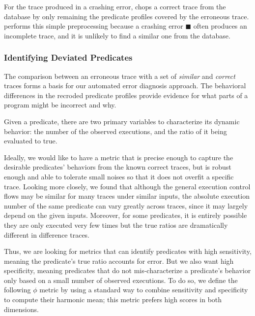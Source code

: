 For the trace produced in a crashing error, \ourtool 
chops a correct trace from the database by only remaining the predicate
profiles covered by the erroneous trace. \ourtool performs
this simple preprocessing because a crashing error $\blacksquare$
often produces an incomplete trace, and it is unlikely
to find a similar one from the database.


\subsubsection{Identifying Deviated Predicates}
\label{sec:deviation}


The comparison between an erroneous trace with a set
of \textit{similar} and \textit{correct} traces forms a basis for our
automated error diagnosis approach. 
The behavioral differences in the recroded predicate profiles provide evidence for what parts of a program might be
incorrect and why. %

Given a predicate, there are two primary variables to
characterize its dynamic behavior: the number of the
observed executions, and the ratio of it being evaluated to true.


Ideally, we would like to have a metric that
is precise enough to capture the desirable predicates' behaviors
from the known correct traces, but is robust enough and
able to tolerate small noises so that it does
not overfit a specific trace.
Looking more closely, we found that although
the general execution control flows may be similar for many 
traces under similar inputs, the absolute execution number of the same predicate
can vary greatly across traces, since it may
largely depend on the given inputs. Moreover, for
some predicates, it is entirely possible they are
only executed very few times but the true ratios
are dramatically different in difference traces.




Thus, we are looking for metrics that can identify
predicates with high sensitivity, meaning the predicate's true
ratio accounts for error. But we also want
high specificity, meaning predicates that do not mis-characterize
a predicate's behavior only based on a small number of
observed executions. To do so, we define the following
$\phi$ metric by using a standard way to
combine sensitivity and specificity to compute their
harmonic mean; this metric prefers high scores in both dimensions. 

